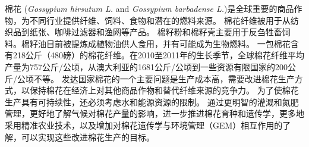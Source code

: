 棉花 (\textit{Gossypium hirsutum L.} and \textit{Gossypium barbadense L.})是全球重要的商品作物，为不同行业提供纤维、饲料、食物和潜在的燃料来源。%
棉花纤维被用于从纺织品到纸张、咖啡过滤器和渔网等产品。%
棉籽粉和棉籽壳主要用于反刍牲畜饲料。棉籽油目前被提炼成植物油供人食用，并有可能成为生物燃料。%
一包棉花含有218公斤（480磅）的棉花纤维。在2010至2011年的生长季节，全球棉花纤维平均产量为757公斤/公顷，从澳大利亚的1681公斤/公顷到一些资源有限国家的200公斤/公顷不等。%
发达国家棉花的一个主要问题是生产成本高，需要改进棉花生产方式，以保持棉花在经济上对其他商品作物和替代纤维来源的竞争力。%
为了使棉花生产具有可持续性，还必须考虑水和能源资源的限制。%
通过更明智的灌溉和氮肥管理，更好地了解气候对棉花产量的影响，进一步推进棉花育种和遗传学，更多地采用精准农业技术，以及增加对棉花遗传学与环境管理（GEM）相互作用的了解，可以实现这些改进棉花生产的目标。

